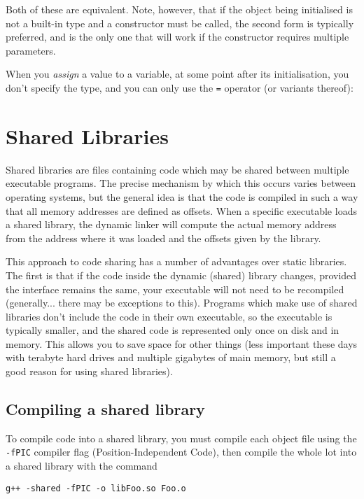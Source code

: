 \documentclass[a4paper]{scrartcl}
\begin{document}


Both of these are equivalent. Note, however, that if the object being initialised is not a built-in type and a constructor must be called, the second form is typically preferred, and is the only one that will work if the constructor requires multiple parameters.

When you \emph{assign} a value to a variable, at some point after its initialisation, you don't specify the type, and you can only use the \verb|=| operator (or variants thereof):



\section{Shared Libraries}
Shared libraries are files containing code which may be shared between multiple executable programs. The precise mechanism by which this occurs varies between operating systems, but the general idea is that the code is compiled in such a way that all memory addresses are defined as offsets. When a specific executable loads a shared library, the dynamic linker will compute the actual memory address from the address where it was loaded and the offsets given by the library.

This approach to code sharing has a number of advantages over static libraries. The first is that if the code inside the dynamic (shared) library changes, provided the interface remains the same, your executable will not need to be recompiled (generally... there may be exceptions to this). Programs which make use of shared libraries don't include the code in their own executable, so the executable is typically smaller, and the shared code is represented only once on disk and in memory. This allows you to save space for other things (less important these days with terabyte hard drives and multiple gigabytes of main memory, but still a good reason for using shared libraries).

\subsection{Compiling a shared library}
To compile code into a shared library, you must compile each object file using the \verb|-fPIC| compiler flag (Position-Independent Code), then compile the whole lot into a shared library with the command
\begin{verbatim}
g++ -shared -fPIC -o libFoo.so Foo.o
\end{verbatim}
\end{document}
